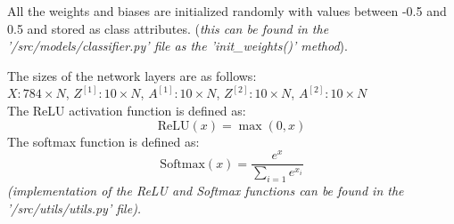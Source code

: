 \documentclass[11pt]{article}
\theoremstyle{definition}
\begin{document}
All the weights and biases are initialized randomly with values between -0.5 and 0.5
and stored as class attributes.
(\emph{this can be found in the '/src/models/classifier.py' file as the 'init\_weights()'
method}). 
\begin{center}
    The sizes of the network layers are as follows:\\
    $X: 784 \times N$, $Z^{[1]}: 10 \times N$, $A^{[1]}: 10 \times N$, $Z^{[2]}: 10 \times N$, $A^{[2]}: 10 \times N$\\[1em]
    The ReLU activation function is defined as:
    \begin{equation}
        \text{ReLU}(x) = \max(0, x)
    \end{equation}
    The softmax function is defined as:
    \begin{equation}
        \text{Softmax}(x) = \frac{e^{x}}{\sum_{i=1}e^{x_i}}
    \end{equation}
    \emph{(implementation of the ReLU and Softmax functions can be found in the 
        '/src/utils/utils.py' file).}
\end{center}
\end{document}
